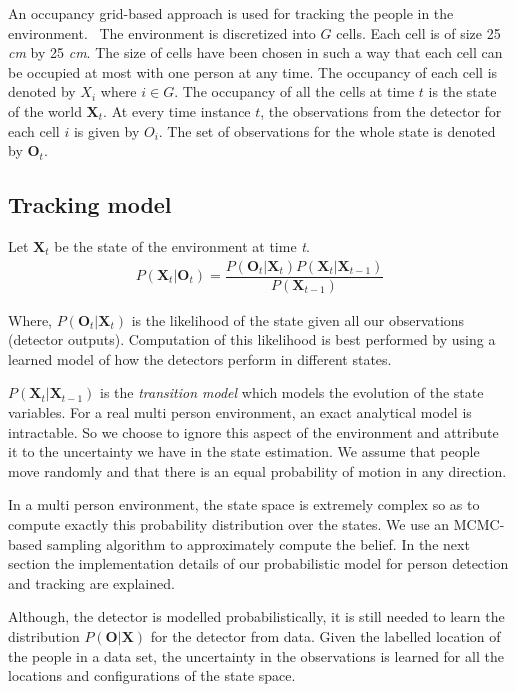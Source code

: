 An occupancy grid-based approach is used for tracking the people in the environment.%
~The environment is discretized into $G$ cells. Each cell is of size 25 \textit{cm} by 25 \textit{cm}. The size of cells have been chosen in such a way that each cell can be occupied at most with one person at any time. The occupancy of each cell is denoted by $X_{i}$ where $i \in G$. The occupancy of all the cells at time $t$ is the state of the world $\textbf{X}_{t}$. At every time instance $t$, the observations from the detector for each cell $i$ is given by $O_{i}$. The set of observations for the whole state is denoted by $\textbf{O}_{t}$. 

\subsection{Tracking model}

Let $\textbf{X}_{t}$ be the state of the environment at time \textit{t}.
\begin{align}
P(\textbf{X}_{t} | \textbf{O}_{t}) = \dfrac{P(\textbf{O}_{t} | \textbf{X}_{t}) P(\textbf{X}_{t}|\textbf{X}_{t-1})} {P(\textbf{X}_{t-1})}
\end{align} 

Where, $P(\textbf{O}_{t} | \textbf{X}_{t})$ is the likelihood of the state given all our observations (detector outputs). Computation of this likelihood is best performed by using a learned model of how the detectors perform in different states.

$P(\textbf{X}_{t}|\textbf{X}_{t-1})$ is the \textit{transition model} which models the evolution of the state variables. For a real multi person environment, an exact analytical model is intractable. So we choose to ignore this aspect of the environment and attribute it to the uncertainty we have in the state estimation. We assume that people move randomly and that there is an equal probability of motion in any direction. 

In a multi person environment, the state space is extremely complex so as to compute exactly this probability 
distribution over the states. We use an MCMC-based sampling algorithm to approximately compute the belief. In the next section the implementation details of our probabilistic model for person detection and tracking are explained.


Although, the detector is modelled probabilistically, it is still needed to learn the distribution $P(\textbf{O}|\textbf{X})$ for the detector from data. Given the labelled location of the people in a data set, the uncertainty in the observations is learned for all the locations and configurations of the state space.




